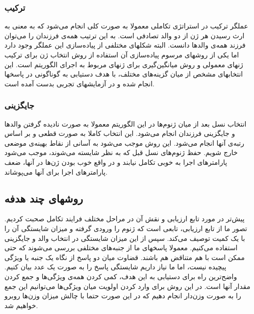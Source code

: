 \documentclass{report}
\begin{document}
\subsubsection{ترکیب}
عملگر ترکیب در استراتژی تکاملی معمولا به صورت کلی انجام می‌شود که به معنی به ارث رسیدن هر ژن از دو والد تصادفی است. به این ترتیب همه‌ی فرزندان را می‌توان فرزند همه‌ی والدها دانست. البته شکلهای مختلفی از پیاده‌سازی این عملگر وجود دارد اما یکی از روشهای مرسوم پیاده‌سازی آن استفاده از روش انتخاب ژن برای ترکیب ژنهای معمولی و روش میانگین‌گیری برای ژنهای مربوط به اجرای الگوریتم است. این انتخابهای مشخص از میان گزینه‌های مختلف، با هدف دستیابی به گوناگونی در پاسخها انجام شده و در آزمایشهای تجربی بدست آمده است.

\subsubsection{جایگزینی}
انتخاب نسل بعد از میان ژنوم‌ها در این الگوریتم معمولا به صورت نادیده گرفتن والدها و جایگزینی فرزندان انجام می‌شود. این انتخاب کاملا به صورت قطعی و بر اساس رتبه‌ی آنها انجام می‌شود. این روش موجب می‌شود به آسانی از نقاط بهینه‌ی موضعی خارج شویم. حفظ ژنوم‌های نسل قبل که به نظر شایسته می‌شوند، موجب می‌شود پارامترهای اجرا به خوبی تکامل نیابند و در واقع خوب بودن ژن‌ها در آنها، ضعف پارامترهای اجرا برای آنها می‌پوشاند.

\subsection{روشهای چند هدفه}
پیش‌تر در مورد تابع ارزیابی و نقش آن در مراحل مختلف فرایند تکامل صحبت کردیم. تصور ما از تابع ارزیابی، تابعی است که ژنوم را ورودی گرفته و میزان شایستگی آن را با یک کمیت توصیف می‌کند. سپس از این میزان شایستگی در انتخاب والد و جایگزینی استفاده می‌کنیم. معمولا پاسخهای ما از جنبه‌های مختلفی بررسی می‌شوند که حتی ممکن است با هم متناقض هم باشند. قضاوت میان دو پاسخ از نگاه یک جنبه یا ویژگی پیچیده نیست، اما ما نیاز داریم شایستگی پاسخ را به صورت یک عدد بیان کنیم. واضح‌ترین راه برای دستیابی به این هدف، کمی کردن همه‌ی ويژگی‌ها و جمع کردن مقدار آنها است. در این روش برای وارد کردن اولویت میان ویژگی‌ها می‌توانیم این جمع را به صورت وزن‌دار انجام دهیم که در این صورت حتما با چالش میزان وزن‌ها روبرو خواهیم شد.
\end{document}
